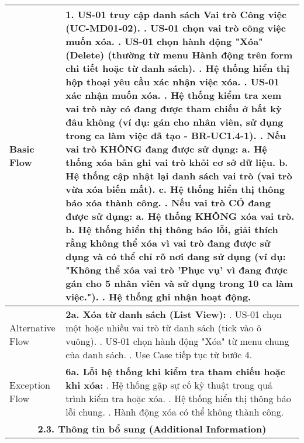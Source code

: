\begin{longtable}{|m{4cm}|p{11cm}|}
Basic Flow & 1. US-01 truy cập danh sách Vai trò Công việc (UC-MD01-02). \newline 2. US-01 chọn vai trò công việc muốn xóa. \newline 3. US-01 chọn hành động "Xóa" (Delete) (thường từ menu Hành động trên form chi tiết hoặc từ danh sách). \newline 4. Hệ thống hiển thị hộp thoại yêu cầu xác nhận việc xóa. \newline 5. US-01 xác nhận muốn xóa. \newline 6. Hệ thống kiểm tra xem vai trò này có đang được tham chiếu ở bất kỳ đâu không (ví dụ: gán cho nhân viên, sử dụng trong ca làm việc đã tạo - BR-UC1.4-1). \newline 7. \textbf{Nếu vai trò KHÔNG đang được sử dụng:} \newline    a. Hệ thống xóa bản ghi vai trò khỏi cơ sở dữ liệu. \newline    b. Hệ thống cập nhật lại danh sách vai trò (vai trò vừa xóa biến mất). \newline    c. Hệ thống hiển thị thông báo xóa thành công. \newline 8. \textbf{Nếu vai trò CÓ đang được sử dụng:} \newline    a. Hệ thống KHÔNG xóa vai trò. \newline    b. Hệ thống hiển thị thông báo lỗi, giải thích rằng không thể xóa vì vai trò đang được sử dụng và có thể chỉ rõ nơi đang sử dụng (ví dụ: "Không thể xóa vai trò 'Phục vụ' vì đang được gán cho 5 nhân viên và sử dụng trong 10 ca làm việc."). \newline 9. Hệ thống ghi nhận hoạt động. \\
\hline
Alternative Flow & \textbf{2a. Xóa từ danh sách (List View):} \newline    1. US-01 chọn một hoặc nhiều vai trò từ danh sách (tick vào ô vuông). \newline    2. US-01 chọn hành động "Xóa" từ menu chung của danh sách. \newline    3. Use Case tiếp tục từ bước 4. \\
\hline
Exception Flow & \textbf{6a. Lỗi hệ thống khi kiểm tra tham chiếu hoặc khi xóa:} \newline    1. Hệ thống gặp sự cố kỹ thuật trong quá trình kiểm tra hoặc xóa. \newline    2. Hệ thống hiển thị thông báo lỗi chung. \newline    3. Hành động xóa có thể không thành công. \\
\hline
\multicolumn{2}{|c|}{\textbf{2.3. Thông tin bổ sung (Additional Information)}} \\

\end{longtable}
